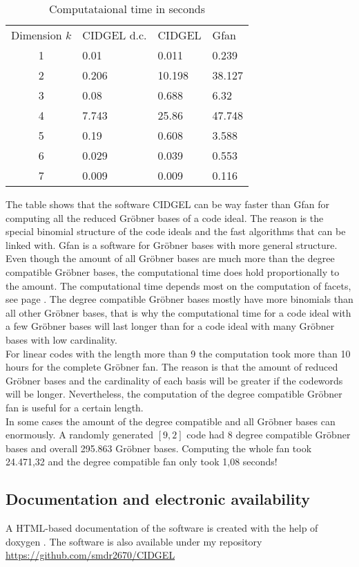  \begin{table}[h]
 \caption{Computataional time in seconds}
 \begin{tabular}{clll} %
  Dimension $k$ & CIDGEL d.c. & CIDGEL & Gfan \\
  1  & 0.01  & 0.011  & 0.239  \\
  2  & 0.206 & 10.198 & 38.127 \\
  3  & 0.08  & 0.688  & 6.32 \\
  4  & 7.743 & 25.86  & 47.748 \\
  5  & 0.19  & 0.608  & 3.588  \\
  6  & 0.029 & 0.039  & 0.553\\
  7  & 0.009 & 0.009  & 0.116 \\
 \end{tabular}
 \label{tab:meinetabelle}
 \end{table}
 
 The table shows that the software CIDGEL can be way faster than Gfan for computing all the reduced Gröbner bases of a code ideal. The reason is the special binomial structure of the code ideals and the fast algorithms that can be linked with. Gfan is a software for Gröbner bases with more general structure.
 Even though the amount of all Gröbner bases are much more than the degree compatible Gröbner bases, the computational time does hold proportionally to the amount.
 The computational time depends most on the computation of facets, see page \pageref{facets}. The degree compatible Gröbner bases mostly have more binomials than all other Gröbner bases, that is why the computational time for a code ideal with a few Gröbner bases will last longer than for a code ideal with many Gröbner bases with low cardinality. \\
 
 For linear codes with the length more than 9 the computation took more than 10 hours for the complete Gröbner fan. The reason is that the amount of reduced Gröbner bases and the cardinality of each basis will be greater if the codewords will be longer. Nevertheless, the computation of the degree compatible Gröbner fan is useful for a certain length.\\
 
 In some cases the amount of the degree compatible and all Gröbner bases can enormously. A randomly generated $[9,2]$ code had 8 degree compatible Gröbner bases and overall 295.863 Gröbner bases. 
 Computing the whole fan took 24.471,32 and the degree compatible fan only took 1,08 seconds! 
    



\subsection{Documentation and electronic availability}
\label{subsec:docu}
A HTML-based documentation of the software is created with the help of doxygen \cite{doxygen}.
The software is also available under my repository \\ \url{https://github.com/smdr2670/CIDGEL}


\newpage

